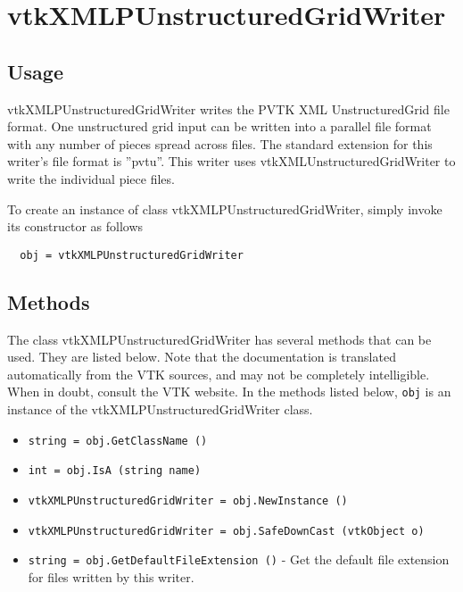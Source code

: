 \section{vtkXMLPUnstructuredGridWriter}

\subsection{Usage}

 vtkXMLPUnstructuredGridWriter writes the PVTK XML UnstructuredGrid
 file format.  One unstructured grid input can be written into a
 parallel file format with any number of pieces spread across files.
 The standard extension for this writer's file format is ''pvtu''.
 This writer uses vtkXMLUnstructuredGridWriter to write the
 individual piece files.

To create an instance of class vtkXMLPUnstructuredGridWriter, simply
invoke its constructor as follows
\begin{verbatim}
  obj = vtkXMLPUnstructuredGridWriter
\end{verbatim}
\subsection{Methods}

The class vtkXMLPUnstructuredGridWriter has several methods that can be used.
  They are listed below.
Note that the documentation is translated automatically from the VTK sources,
and may not be completely intelligible.  When in doubt, consult the VTK website.
In the methods listed below, \verb|obj| is an instance of the vtkXMLPUnstructuredGridWriter class.
\begin{itemize}
\item  \verb|string = obj.GetClassName ()|

\item  \verb|int = obj.IsA (string name)|

\item  \verb|vtkXMLPUnstructuredGridWriter = obj.NewInstance ()|

\item  \verb|vtkXMLPUnstructuredGridWriter = obj.SafeDownCast (vtkObject o)|

\item  \verb|string = obj.GetDefaultFileExtension ()| -  Get the default file extension for files written by this writer.

\end{itemize}
